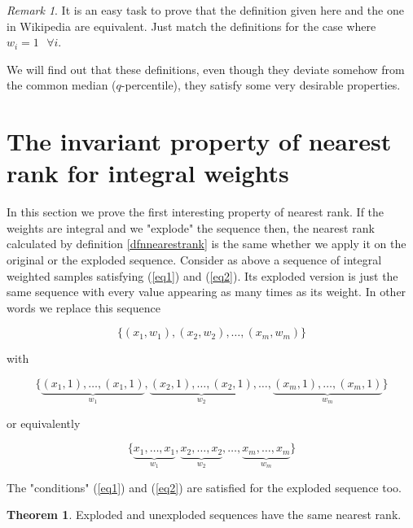 \documentclass[a4paper,11pt]{article} %
\theoremstyle{definition}
\newtheorem{theorem}{Theorem}[section]
\theoremstyle{remark}
\newtheorem*{rem}{Remark}
\begin{document}
\begin{rem}
It is an easy task to prove that the definition given here and the one in Wikipedia are equivalent. Just match the definitions for the case where $w_{i}=1\text{      }\forall{i}$.
\end{rem}
We will find out that these definitions, even though they deviate somehow from  the common median ($q$-percentile), they satisfy some very desirable properties.

\section{The invariant property of nearest rank for integral weights}
In this section we prove the first interesting property of nearest rank. If the weights are integral and we "explode" the sequence then, the nearest rank calculated by definition \ref{dfnnearestrank} is the same whether we apply it on the original or the exploded sequence. 
Consider as above a sequence of integral weighted samples satisfying (\ref{eq1}) and (\ref{eq2}). Its exploded version is just the same sequence with every value appearing as many times as its weight. In other words we replace this sequence

\begin{equation}
\label{unexploded}
\{(x_{1},w_{1}), (x_{2},w_{2}),\ldots, (x_{m}, w_{m})\}
\end{equation}

with

\begin{equation}
\label{exploded}
\{ \underbrace{(x_{1},1), \ldots, (x_{1}, 1)}_{w_{1}}, \underbrace{(x_{2}, 1), \ldots, (x_{2}, 1)}_{w_{2}}, \ldots, \underbrace{(x_{m},1), \ldots, (x_{m},1)}_{w_{m}} \}
\end{equation}

or equivalently

\begin{equation}
  \{ \underbrace{x_{1}, \ldots, x_{1}}_{w_{1}}, \underbrace{x_{2}, \ldots, x_{2}}_{w_{2}}, \ldots, \underbrace{x_{m}, \ldots, x_{m}}_{w_{m}} \}
\end{equation}

The "conditions" (\ref{eq1}) and (\ref{eq2}) are satisfied for the exploded sequence too. 

\begin{theorem}
Exploded and unexploded sequences have the same nearest rank.
\end{theorem}
\end{document}
